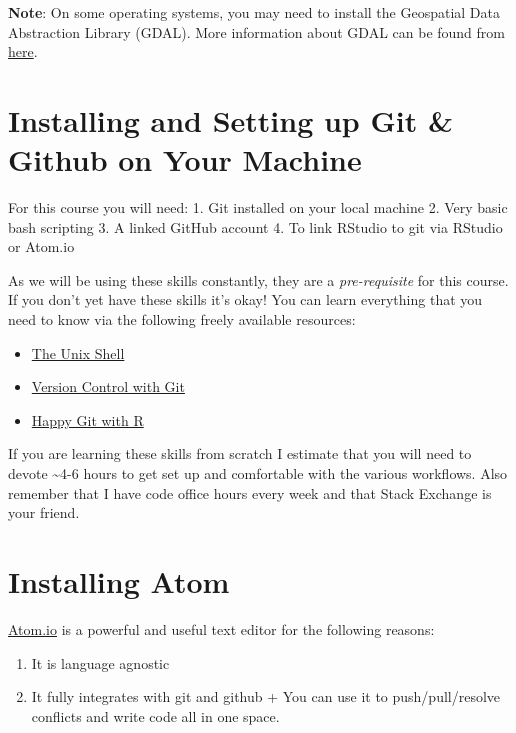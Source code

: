 \documentclass[
  letterpaper,
]{book}
\begin{document}
\textbf{Note}: On some operating systems, you may need to install the
Geospatial Data Abstraction Library (GDAL). More information about GDAL
can be found from
\href{https://trac.osgeo.org/gdal/wiki/DownloadingGdalBinaries}{here}.

\section*{Installing and Setting up Git \& Github on Your
Machine}\label{installing-and-setting-up-git-github-on-your-machine}


For this course you will need: 1. Git installed on your local machine 2.
Very basic bash scripting 3. A linked GitHub account 4. To link RStudio
to git via RStudio or Atom.io

As we will be using these skills constantly, they are a
\emph{pre-requisite} for this course. If you don't yet have these skills
it's okay! You can learn everything that you need to know via the
following freely available resources:

\begin{itemize}
\item
  \href{http://swcarpentry.github.io/shell-novice}{The Unix Shell}
\item
  \href{http://swcarpentry.github.io/git-novice}{Version Control with
  Git}
\item
  \href{https://happygitwithr.com/}{Happy Git with R}
\end{itemize}

If you are learning these skills from scratch I estimate that you will
need to devote \textasciitilde4-6 hours to get set up and comfortable
with the various workflows. Also remember that I have code office hours
every week and that Stack Exchange is your friend.

\section*{Installing Atom}\label{installing-atom}


\href{https://atom.io/}{Atom.io} is a powerful and useful text editor
for the following reasons:

\begin{enumerate}
\def\labelenumi{\arabic{enumi}.}
\item
  It is language agnostic
\item
  It fully integrates with git and github + You can use it to
  push/pull/resolve conflicts and write code all in one space.
\end{enumerate}
\end{document}
